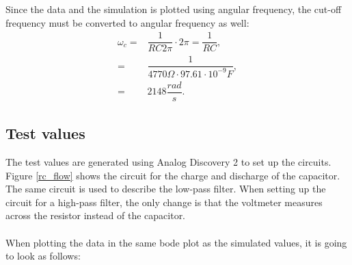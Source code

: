 \noindent Since the data and the simulation is plotted using angular frequency, the cut-off frequency must be converted to angular frequency as well:
\begin{align}
	\omega _c =& \dfrac{1}{RC2\pi} \cdot 2\pi = \dfrac{1}{RC}, \nonumber \\
			  =& \dfrac{1}{4770 \Omega \cdot 97.61 \cdot 10^{-9} F}, \nonumber \\
			  =& 2148 \dfrac{rad}{s}. \label{sim:cut}
\end{align}

\subsection{Test values}
The test values are generated using Analog Discovery 2 to set up the circuits. Figure \ref{rc_flow} shows the circuit for the charge and discharge of the capacitor. The same circuit is used to describe the low-pass filter. When setting up the circuit for a high-pass filter, the only change is that the voltmeter measures across the resistor instead of the capacitor. 
\\ \\ 
When plotting the data in the same bode plot as the simulated values, it is going to look as follows:
